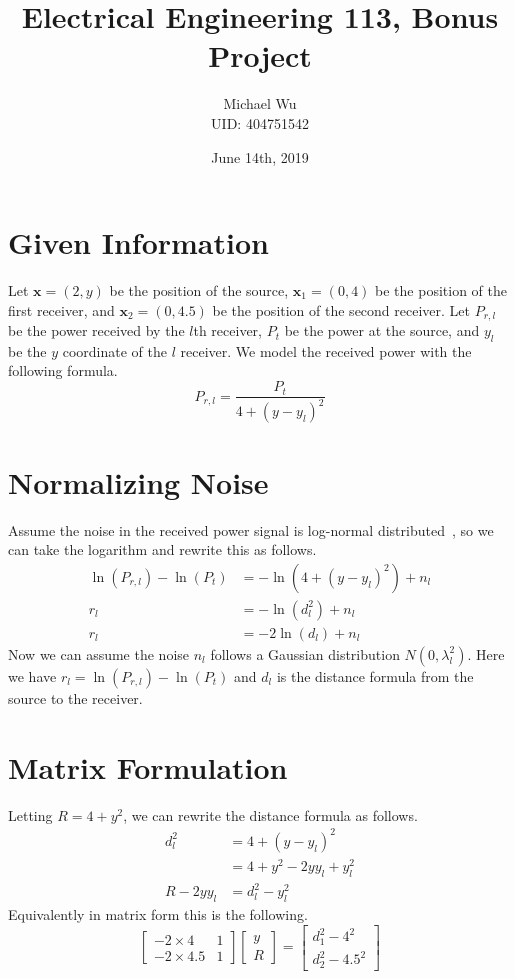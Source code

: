 \documentclass[12pt]{article}
\begin{document}
\title{Electrical Engineering 113, Bonus Project}
\date{June 14th, 2019}
\author{Michael Wu\\UID: 404751542}
\maketitle

\section{Given Information}

Let \(\mathbf{x} = (2,y)\) be the position of the source, \(\mathbf{x}_1 = (0,4)\)
be the position of the first receiver, and \(\mathbf{x}_2 = (0,4.5)\) be the position
of the second receiver. Let \(P_{r,l}\) be the power received by the \(l\)th receiver,
\(P_t\) be the power at the source, and \(y_l\) be the \(y\) coordinate of the \(l\)
receiver. We model the received power with the following formula.
\[P_{r,l}=\frac{P_t}{4 + (y-y_l)^2}\]

\section{Normalizing Noise}

Assume the noise in the received power signal is log-normal distributed~\cite{So}, so we can take the logarithm
and rewrite this as follows.
\begin{align*}
    \ln(P_{r,l})-\ln(P_t)&=-\ln\left(4 + (y-y_l)^2\right) + n_l\\
    r_l&=-\ln(d_l^2) + n_l\\
    r_l&=-2\ln(d_l) + n_l
\end{align*}
Now we can assume the noise \(n_l\) follows a Gaussian distribution \(N(0,\lambda_l^2)\).
Here we have \(r_l=\ln(P_{r,l})-\ln(P_t)\) and \(d_l\) is the distance formula from the
source to the receiver.

\section{Matrix Formulation}

Letting \(R=4+y^2\), we can rewrite the distance formula as follows.
\begin{align*}
    d_l^2&=4 + (y-y_l)^2\\
    &=4 + y^2 - 2yy_l + y_l^2\\
    R - 2yy_l&=d_l^2-y_l^2
\end{align*}
Equivalently in matrix form this is the following.
\[\begin{bmatrix}-2\times4 & 1\\-2\times4.5 & 1\end{bmatrix}\begin{bmatrix}y\\R\end{bmatrix}
=\begin{bmatrix}d_1^2-4^2\\d_2^2-4.5^2\end{bmatrix}\]
\end{document}
